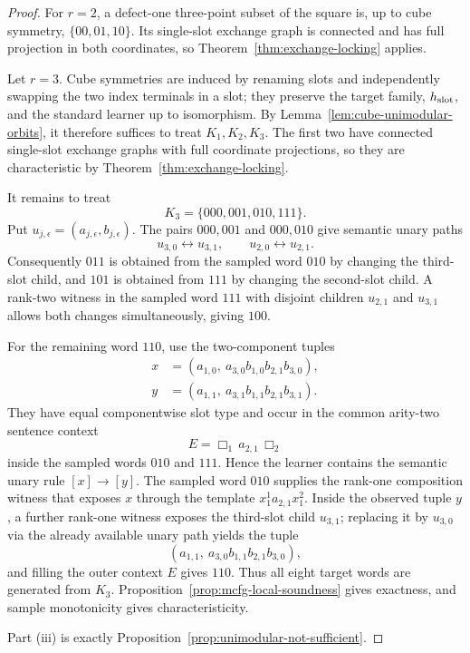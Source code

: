 \documentclass[11pt]{article}
\begin{document}
\begin{proof}
For $r=2$, a defect-one three-point subset of the square is, up to cube
symmetry, $\{00,01,10\}$.  Its single-slot exchange graph is connected and
has full projection in both coordinates, so
Theorem~\ref{thm:exchange-locking} applies.

Let $r=3$.  Cube symmetries are induced by renaming slots and independently
swapping the two index terminals in a slot; they preserve the target family,
$h_{\rm slot}$, and the standard learner up to isomorphism.  By
Lemma~\ref{lem:cube-unimodular-orbits}, it therefore suffices to treat
$K_1,K_2,K_3$.  The first two have connected single-slot exchange graphs with
full coordinate projections, so they are characteristic by
Theorem~\ref{thm:exchange-locking}.

It remains to treat
\[
  K_3=\{000,001,010,111\}.
\]
Put $u_{j,\epsilon}=(a_{j,\epsilon},b_{j,\epsilon})$.  The pairs
$000,001$ and $000,010$ give semantic unary paths
\[
 u_{3,0}\leftrightarrow u_{3,1},
 \qquad
 u_{2,0}\leftrightarrow u_{2,1}.
\]
Consequently $011$ is obtained from the sampled word $010$ by changing the
third-slot child, and $101$ is obtained from $111$ by changing the second-slot
child.  A rank-two witness in the sampled word $111$ with disjoint children
$u_{2,1}$ and $u_{3,1}$ allows both changes simultaneously, giving $100$.

For the remaining word $110$, use the two-component tuples
\[
\begin{aligned}
 x&=(a_{1,0},\ a_{3,0}b_{1,0}b_{2,1}b_{3,0}),\\
 y&=(a_{1,1},\ a_{3,1}b_{1,1}b_{2,1}b_{3,1}).
\end{aligned}
\]
They have equal componentwise slot type and occur in the common arity-two
sentence context
\[
  E=\Box_1\,a_{2,1}\,\Box_2
\]
inside the sampled words $010$ and $111$.  Hence the learner contains the
semantic unary rule $[x]\to[y]$.  The sampled word $010$ supplies the rank-one
composition witness that exposes $x$ through the template
$x_1^1 a_{2,1}x_1^2$.  Inside the observed tuple $y$, a further rank-one
witness exposes the third-slot child $u_{3,1}$; replacing it by $u_{3,0}$ via
the already available unary path yields the tuple
\[
  (a_{1,1},\ a_{3,0}b_{1,1}b_{2,1}b_{3,0}),
\]
and filling the outer context $E$ gives $110$.
Thus all eight target words are generated from $K_3$.  Proposition~\ref{prop:mcfg-local-soundness} gives exactness,
and sample monotonicity gives characteristicity.

Part \textup{(iii)} is exactly
Proposition~\ref{prop:unimodular-not-sufficient}.
\end{proof}
\end{document}
